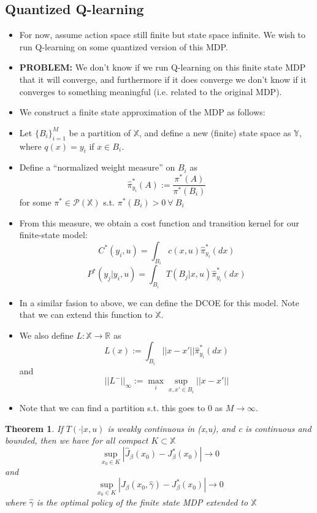 \documentclass{article}
\newtheorem{theorem}{Theorem}[section]
\begin{document}
\subsection{Quantized Q-learning}
\begin{itemize}
    \item For now, assume action space still finite but state space infinite. We wish to run Q-learning on some quantized version of this MDP.
    \item \textbf{PROBLEM:} We don't know if we run Q-learning on this finite state MDP that it will converge, and furthermore if it does converge we don't know if it converges to something meaningful (i.e. related to the original MDP).
    \item We construct a finite state approximation of the MDP as follows:
    \item Let \(\{B_i\}_{i=1}^{M}\) be a partition of \(\mathbb{X}\), and define a new (finite) state space as \(\mathbb{Y}\), where \(q(x) = y_i\) if \(x \in B_i\).
    \item Define a ``normalized weight measure'' on \(B_i\) as
          \[\hat{\pi}^*_{y_i}(A) := \frac{\pi^*(A)}{\pi^*(B_i)}\] for some \(\pi^* \in \mathcal{P}(\mathbb{X})\) s.t. \(\pi^*(B_i) > 0 \: \forall \: B_i\)
    \item From this measure, we obtain a cost function and transition kernel for our finite-state model:
          \[ C^*(y_i,u) = \int_{B_i}c(x,u)\hat{\pi}^*_{y_i}(dx) \]
          \[ P^*(y_j | y_i,u) = \int_{B_i}T(B_j | x,u)\hat{\pi}^*_{y_i}(dx) \]
    \item In a similar fasion to above, we can define the DCOE for this model. Note that we can extend this function to \(\mathbb{X}\).
    \item We also define \( L : \mathbb{X} \to \mathbb{R} \) as
          \[L(x) := \int_{B_i}||x-x'||\hat{\pi}^*_{y_i}(dx)\]
          and
          \[||L^-||_\infty := \max_i \sup_{x,x' \in B_i} ||x-x'||\]
    \item Note that we can find a partition s.t. this goes to 0 as \(M \to \infty\).
\end{itemize}

\begin{theorem}
    If \(T(\cdot | x,u)\) is weakly continuous in (x,u), and c is continuous and bounded, then we have for all compact \(K \subset \mathbb{X}\)
    \[ \sup_{x_0 \in K}|\hat{J}_\beta(x_0) - J^*_\beta(x_0)| \to 0 \]
    and
    \[ \sup_{x_0 \in K}|J_\beta(x_0,\hat{\gamma}) - J^*_\beta(x_0)| \to 0 \]
    where \(\hat{\gamma}\) is the optimal policy of the finite state MDP extended to \(\mathbb{X}\)
\end{theorem}
\end{document}
